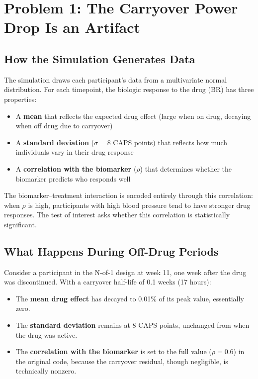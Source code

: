 \documentclass[11pt]{article}
\begin{document}
\section{Problem 1: The Carryover Power Drop Is an Artifact}

\subsection{How the Simulation Generates Data}

The simulation draws each participant's data from a
multivariate normal distribution. For each timepoint, the
biologic response to the drug (BR) has three properties:

\begin{itemize}
\item A \textbf{mean} that reflects the expected drug effect
  (large when on drug, decaying when off drug due to
  carryover)
\item A \textbf{standard deviation} ($\sigma = 8$ CAPS points)
  that reflects how much individuals vary in their drug
  response
\item A \textbf{correlation with the biomarker} ($\rho$) that
  determines whether the biomarker predicts who responds well
\end{itemize}

The biomarker--treatment interaction is encoded entirely
through this correlation: when $\rho$ is high, participants
with high blood pressure tend to have stronger drug responses.
The test of interest asks whether this correlation is
statistically significant.

\subsection{What Happens During Off-Drug Periods}

Consider a participant in the N-of-1 design at week 11, one
week after the drug was discontinued. With a carryover
half-life of 0.1 weeks (17 hours):

\begin{itemize}
\item The \textbf{mean drug effect} has decayed to 0.01\% of
  its peak value, essentially zero.
\item The \textbf{standard deviation} remains at 8 CAPS
  points, unchanged from when the drug was active.
\item The \textbf{correlation with the biomarker} is set to
  the full value ($\rho = 0.6$) in the original code, because
  the carryover residual, though negligible, is technically
  nonzero.
\end{itemize}
\end{document}
